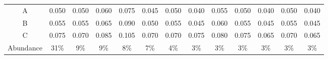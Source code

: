 \begin{tabular}{ccccccccccccc}
   \hline
A & 0.050 & 0.050 & 0.060 & 0.075 & 0.045 & 0.050 & 0.040 & 0.055 & 0.050 & 0.040 & 0.050 & 0.040 \\ 
  B & 0.055 & 0.055 & 0.065 & 0.090 & 0.050 & 0.055 & 0.045 & 0.060 & 0.055 & 0.045 & 0.055 & 0.045 \\ 
  C & 0.075 & 0.070 & 0.085 & 0.105 & 0.070 & 0.070 & 0.075 & 0.080 & 0.075 & 0.065 & 0.070 & 0.065 \\ 
  Abundance & 31\% & 9\% & 9\% & 8\% & 7\% & 4\% & 3\% & 3\% & 3\% & 3\% & 3\% & 3\% \\ 
   \hline
\end{tabular}

